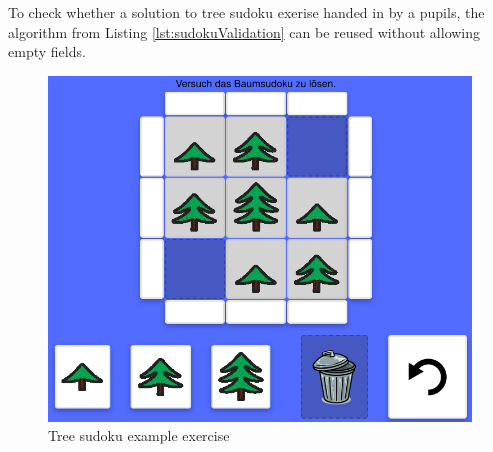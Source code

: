 
To check whether a solution to tree sudoku exerise handed in by a pupils, the algorithm from Listing \ref{lst:sudokuValidation} can be reused without allowing empty fields.

\begin{figure} 
    \centering
    \includegraphics[width=0.4 \columnwidth]{figures/tree_sudoku_example_exercise.png}
    \caption{Tree sudoku example exercise} 
    \label{fig:tree_sudoku_example} 
\end{figure}